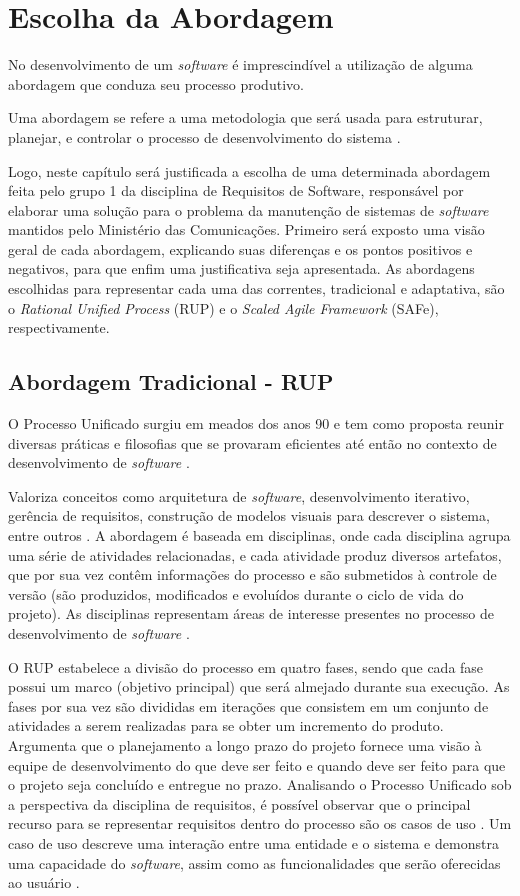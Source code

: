 \chapter[Escolha da Abordagem]{Escolha da Abordagem}
No desenvolvimento de um \emph{software} é imprescindível a utilização de alguma abordagem que conduza seu processo produtivo.

Uma abordagem se refere a uma metodologia que será usada para estruturar, planejar, e controlar o processo de desenvolvimento do sistema \cite{CMS001}.

Logo, neste capítulo será justificada a escolha de uma determinada abordagem feita pelo grupo 1 da disciplina de Requisitos de Software, responsável por elaborar uma solução para o problema da manutenção de sistemas de \emph{software} mantidos pelo Ministério das Comunicações. Primeiro será exposto uma visão geral de cada abordagem, explicando suas diferenças e os pontos positivos e negativos, para que enfim uma justificativa seja apresentada. As abordagens escolhidas para representar cada uma das correntes, tradicional e adaptativa, são o \emph{Rational Unified Process} (RUP) e o \emph{Scaled Agile Framework} (SAFe), respectivamente.

\section{Abordagem Tradicional - RUP}
O Processo Unificado surgiu em meados dos anos 90 e tem como proposta reunir diversas práticas e filosofias que se provaram eficientes até então no contexto de desenvolvimento de \emph{software} \cite[p. 45]{kruchten001}.

Valoriza conceitos como arquitetura de \emph{software}, desenvolvimento iterativo, gerência de requisitos, construção de modelos visuais para descrever o sistema, entre outros \cite[p. 45]{kruchten001}. A abordagem é baseada em disciplinas, onde cada disciplina agrupa uma série de atividades relacionadas, e cada atividade produz diversos artefatos, que por sua vez contêm informações do processo e são submetidos à controle de versão (são produzidos, modificados e evoluídos durante o ciclo de vida do projeto). As disciplinas representam áreas de interesse presentes no processo de desenvolvimento de \emph{software} \cite[p. 45]{kruchten001}.

O RUP estabelece a divisão do processo em quatro fases, sendo que cada fase possui um marco (objetivo principal) que será almejado durante sua execução. As fases por sua vez são divididas em iterações que consistem em um conjunto de atividades a serem realizadas para se obter um incremento do produto. Argumenta que o planejamento a longo prazo do projeto fornece uma visão à equipe de desenvolvimento do que deve ser feito e quando deve ser feito para que o projeto seja concluído e entregue no prazo. Analisando o Processo Unificado sob a perspectiva da disciplina de requisitos, é possível observar que o principal recurso para se representar requisitos dentro do processo são os casos de uso \cite[p. 45]{kruchten001}. Um caso de uso descreve uma interação entre uma entidade e o sistema e demonstra uma capacidade do \emph{software}, assim como as funcionalidades que serão oferecidas ao usuário \cite[p. 124-125]{kruchten001}.

